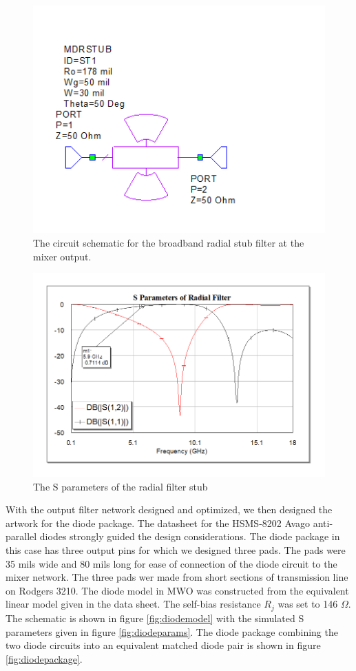 \documentclass[twocolumn, aps, floatfix]{revtex4-1}
\begin{document}
\begin{figure}[!htbp]
    \includegraphics[scale=0.7]{radial_stub.png}
    \caption{The circuit schematic for the broadband radial stub filter at the mixer output.}
    \label{fig:radialstub}
\end{figure}

\begin{figure}[!htbp]
    \includegraphics[scale=0.4]{filter_Sparams.png}
    \caption{The S parameters of the radial filter stub}
    \label{fig:radialparams}
\end{figure}

With the output filter network designed and optimized, we then designed the artwork for the diode package. The datasheet for the HSMS-8202 Avago anti-parallel diodes strongly guided the design considerations. The diode package in this case has three output pins for which we designed three pads. The pads were 35 mils wide and 80 mils long for ease of connection of the diode circuit to the mixer network. The three pads wer made from short sections of transmission line on Rodgers 3210. The diode model in MWO was constructed from the equivalent linear model given in the data sheet. The self-bias resistance $R_j$ was set to 146 $\Omega$. The schematic is shown in figure \ref{fig:diodemodel} with the simulated S parameters given in figure \ref{fig:diodeparams}. The diode package combining the two diode circuits into an equivalent matched diode pair is shown in figure \ref{fig:diodepackage}. 
\end{document}
